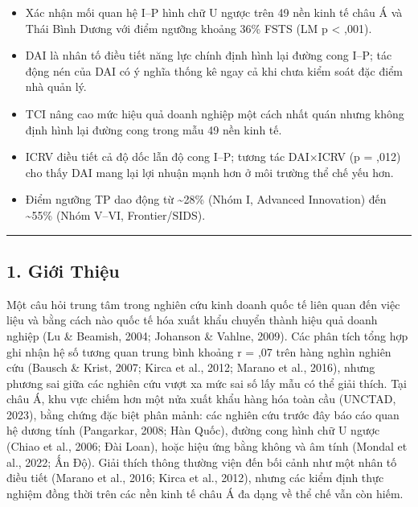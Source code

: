\documentclass[12pt,a4paper]{article}
\providecommand{\tightlist}{\setlength{\itemsep}{0pt}\setlength{\parskip}{0pt}}
\begin{document}
\begin{itemize}
\tightlist
\item
  Xác nhận mối quan hệ I--P hình chữ U ngược trên 49 nền kinh tế châu Á
  và Thái Bình Dương với điểm ngưỡng khoảng 36\% FSTS (LM p \textless{}
  ,001).
\item
  DAI là nhân tố điều tiết năng lực chính định hình lại đường cong I--P;
  tác động nén của DAI có ý nghĩa thống kê ngay cả khi chưa kiểm soát
  đặc điểm nhà quản lý.
\item
  TCI nâng cao mức hiệu quả doanh nghiệp một cách nhất quán nhưng không
  định hình lại đường cong trong mẫu 49 nền kinh tế.
\item
  ICRV điều tiết cả độ dốc lẫn độ cong I--P; tương tác DAI×ICRV (p =
  ,012) cho thấy DAI mang lại lợi nhuận mạnh hơn ở môi trường thể chế
  yếu hơn.
\item
  Điểm ngưỡng TP dao động từ \textasciitilde28\% (Nhóm I, Advanced
  Innovation) đến \textasciitilde55\% (Nhóm V--VI, Frontier/SIDS).
\end{itemize}

\begin{center}\rule{0.5\linewidth}{0.5pt}\end{center}

\hypertarget{1-giux1edbi-thiux1ec7u}{%
\subsection{1. Giới Thiệu}\label{1-giux1edbi-thiux1ec7u}}

Một câu hỏi trung tâm trong nghiên cứu kinh doanh quốc tế liên quan đến
việc liệu và bằng cách nào quốc tế hóa xuất khẩu chuyển thành hiệu quả
doanh nghiệp (Lu \& Beamish, 2004; Johanson \& Vahlne, 2009). Các phân
tích tổng hợp ghi nhận hệ số tương quan trung bình khoảng r = ,07 trên
hàng nghìn nghiên cứu (Bausch \& Krist, 2007; Kirca et al., 2012; Marano
et al., 2016), nhưng phương sai giữa các nghiên cứu vượt xa mức sai số
lấy mẫu có thể giải thích. Tại châu Á, khu vực chiếm hơn một nửa xuất
khẩu hàng hóa toàn cầu (UNCTAD, 2023), bằng chứng đặc biệt phân mảnh:
các nghiên cứu trước đây báo cáo quan hệ dương tính (Pangarkar, 2008;
Hàn Quốc), đường cong hình chữ U ngược (Chiao et al., 2006; Đài Loan),
hoặc hiệu ứng bằng không và âm tính (Mondal et al., 2022; Ấn Độ). Giải
thích thông thường viện đến bối cảnh như một nhân tố điều tiết (Marano
et al., 2016; Kirca et al., 2012), nhưng các kiểm định thực nghiệm đồng
thời trên các nền kinh tế châu Á đa dạng về thể chế vẫn còn hiếm.
\end{document}
